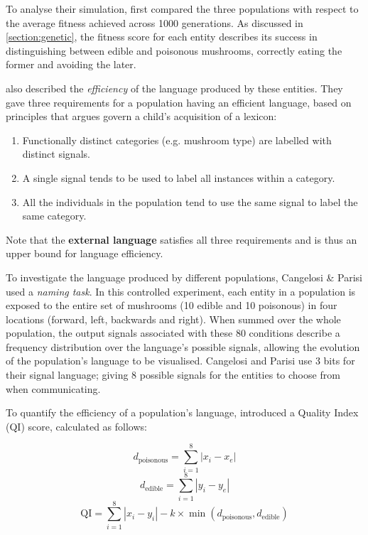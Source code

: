 \documentclass[12pt,a4paper]{report}
\begin{document}
To analyse their simulation, \cite{Cangelosi1998} first compared the three populations with respect to the average fitness achieved across 1000 generations. As discussed in \cref{section:genetic}, the fitness score for each entity describes its success in distinguishing between edible and poisonous mushrooms, correctly eating the former and avoiding the later.

\cite{Cangelosi1998} also described the \emph{efficiency} of the language produced by these entities. They gave three requirements for a population having an efficient language, based on principles that \cite{Clark1995} argues govern a child's acquisition of a lexicon:

\begin{enumerate}
	\item Functionally distinct categories (e.g. mushroom type) are labelled with distinct signals.
	\item A single signal tends to be used to label all instances within a category.
	\item All the individuals in the population tend to use the same signal to label the same category.
\end{enumerate}

Note that the {\bf external language} satisfies all three requirements and is thus an upper bound for language efficiency.

To investigate the language produced by different populations, Cangelosi \& Parisi used a \emph{naming task}. In this controlled experiment, each entity in a population is exposed to the entire set of mushrooms (10 edible and 10 poisonous) in four locations (forward, left, backwards and right). When summed over the whole population, the output signals associated with these 80 conditions describe a frequency distribution over the language's possible signals, allowing the evolution of the population's language to be visualised. Cangelosi and Parisi use 3 bits for their signal language; giving 8 possible signals for the entities to choose from when communicating.

To quantify the efficiency of a population's language, \citet{Cangelosi1998} introduced a Quality Index (QI) score, calculated as follows:

\begin{equation}
\label{equation:dpoisonous}
d_{\mathrm{poisonous}} = \sum^{8}_{i = 1}{|x_i - x_e|}
\end{equation}
\begin{equation}
\label{equation:dedible}
d_{\mathrm{edible}} = \sum^{8}_{i = 1}{|y_i - y_e|}
\end{equation}
\begin{equation}
\label{equation:qi}
\mathrm{QI} = \sum^{8}_{i = 1} |x_i - y_i| - k \times \min (d_{\mathrm{poisonous}}, d_{\mathrm{edible}})
\end{equation}
\end{document}
